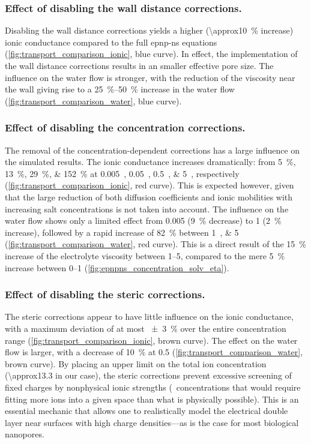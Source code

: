 %
\subsubsection{Effect of disabling the wall distance corrections.}
%

Disabling the wall distance corrections yields a higher (\SI{\approx10}{\percent} increase) ionic conductance
compared to the full \gls{epnp-ns} equations (\cref{fig:transport_comparison_ionic}, blue curve). In effect,
the implementation of the wall distance corrections results in an smaller effective pore size.  The influence
on the water flow is stronger, with the reduction of the viscosity near the wall giving rise to a
\SIrange{25}{50}{\percent} increase in the water flow (\cref{fig:transport_comparison_water}, blue curve).

%
\subsubsection{Effect of disabling the concentration corrections.}
%

The removal of the concentration-dependent corrections has a large influence on the simulated results. The
ionic conductance increases dramatically: from \SIlist{5;13;29;152}{\percent} at
\SIlist{0.005;0.05;0.5;5}{\Molar}, respectively (\cref{fig:transport_comparison_ionic}, red curve). This is
expected however, given that the large reduction of both diffusion coefficients and ionic mobilities with
increasing salt concentrations is not taken into account. The influence on the water flow shows only a limited
effect from \SI{0.005}{\Molar} (\SI{9}{\percent} decrease) to \SI{1}{\Molar} (\SI{2}{\percent} increase),
followed by a rapid increase of \SI{82}{\percent} between \SIlist{1;5}{\Molar}
(\cref{fig:transport_comparison_water}, red curve). This is a direct result of the \SI{15}{\percent} increase
of the electrolyte viscosity between \SIrange{1}{5}{\Molar}, compared to the mere \SI{5}{\percent} increase
between \SIrange{0}{1}{\Molar} (\cref{fig:epnpns_concentration_solv_eta}).

%
\subsubsection{Effect of disabling the steric corrections.}
%
The steric corrections appear to have little influence on the ionic conductance, with a maximum deviation of
at most \SI{\pm3}{\percent} over the entire concentration range (\cref{fig:transport_comparison_ionic}, brown
curve). The effect on the water flow is larger, with a decrease of \SI{10}{\percent} at \SI{0.5}{\Molar}
(\cref{fig:transport_comparison_water}, brown curve). By placing an upper limit on the total ion concentration
(\SI{\approx13.3}{\Molar} in our case), the steric corrections prevent excessive screening of fixed charges by
nonphysical ionic strengths (\ie~concentrations that would require fitting more ions into a given space than
what is physically possible). This is an essential mechanic that allows one to realistically model the
electrical double layer near surfaces with high charge densities---as is the case for most biological
nanopores.


